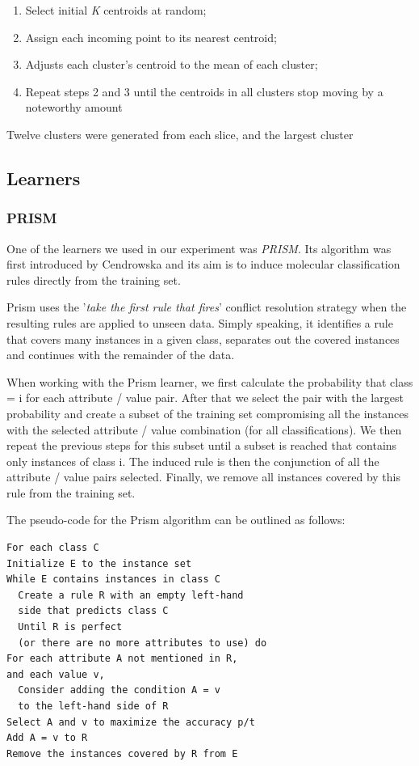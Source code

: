 \documentclass{sig-alternate}
\begin{document}
\begin{centering}
\begin{enumerate}
\item{Select initial {\em K} centroids at random;}
\item{Assign each incoming point to its nearest centroid;}
\item{Adjusts each cluster's centroid to the mean of each cluster;}
\item{Repeat steps 2 and 3 until the centroids in all clusters stop moving by a noteworthy amount}
\end{enumerate}
\end{centering}

Twelve clusters were generated from each slice, and the largest cluster

\subsection{Learners}
\subsubsection{PRISM}
One of the learners we used in our experiment was {\em PRISM}. Its algorithm was first introduced by Cendrowska and its aim is to induce molecular classification rules directly from the training set.

Prism uses the '{\em take the first rule that fires}' conflict resolution strategy when the resulting rules are applied to unseen data. Simply speaking, it identifies a rule that covers many instances in a given class, separates out the covered instances and continues with the remainder of the data.

When working with the Prism learner, we first calculate the probability that class = i for each attribute / value pair. After that we select the pair with the largest probability and create a subset of the training set compromising all the instances with the selected attribute / value combination (for all classifications). We then repeat the previous steps for this subset until a subset is reached that contains only instances of class i. The induced rule is then the conjunction of all the attribute / value pairs selected. Finally, we remove all instances covered by this rule from the training set.


The pseudo-code for the Prism algorithm can be outlined as follows:
\begin{verbatim}
For each class C
Initialize E to the instance set
While E contains instances in class C
  Create a rule R with an empty left-hand
  side that predicts class C
  Until R is perfect 
  (or there are no more attributes to use) do
For each attribute A not mentioned in R, 
and each value v,
  Consider adding the condition A = v 
  to the left-hand side of R
Select A and v to maximize the accuracy p/t
Add A = v to R
Remove the instances covered by R from E
\end{verbatim}
\end{document}
